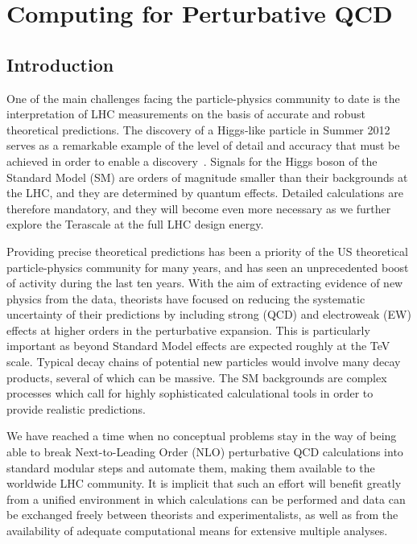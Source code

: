 \section{Computing for Perturbative QCD}
\label{chap:PQCD}
\subsection{Introduction}

One of the main challenges facing the particle-physics community to date
is the interpretation of LHC measurements on the basis of accurate and
robust theoretical predictions.  The discovery of a Higgs-like
particle in Summer 2012~\cite{Aad:2012tfa,Chatrchyan:2012ufa} serves
as a remarkable example of the level of detail and accuracy that must
be achieved in order to enable a
discovery~\cite{Dittmaier:2011ti,Dittmaier:2012vm,Heinemeyer:2013tqa}.
Signals for the Higgs boson of the Standard Model (SM) are orders of 
magnitude smaller than their backgrounds at the LHC, and they are 
determined by quantum effects.  Detailed calculations are therefore 
mandatory, and they will become even more necessary as we further 
explore the Terascale at the full LHC design energy.

Providing precise theoretical predictions has been a priority of the US 
theoretical particle-physics community for many years, and has seen an
unprecedented boost of activity during the last ten years. With the
aim of extracting evidence of new physics from the data, theorists
have focused on reducing the systematic uncertainty of their predictions
by including strong (QCD) and electroweak (EW) effects at higher orders
in the perturbative expansion. This is particularly important as
beyond Standard Model effects are expected roughly at the TeV scale. 
Typical decay chains of potential new particles would involve many 
decay products, several of which can be massive. The SM backgrounds 
are complex processes which call for highly sophisticated calculational 
tools in order to provide realistic predictions.

We have reached a time when no conceptual problems stay in
the way of being able to break Next-to-Leading Order (NLO)
perturbative QCD calculations into standard modular steps and automate
them, making them available to the worldwide LHC community.  It is
implicit that such an effort will benefit greatly from a unified
environment in which calculations can be performed and data can be
exchanged freely between theorists and experimentalists,
as well as from the availability of adequate computational means
for extensive multiple analyses.

